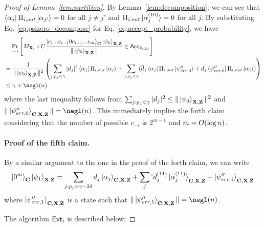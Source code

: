 \begin{proof}[Proof of Lemma~\ref{lem:partition}]
By Lemma~\ref{lem:decomposition}, we can see that $\bra{\alpha_j}\Pi_{i,out} \ket{\alpha_{j'}}=0$ for all $j\neq j'$ and $\Pi_{i,out} \ket{\alpha_{j}^{(10)}}=0$ for all $j$.
By substituting Eq. \ref{eq:psizero_decompose} for Eq. \ref{eq:accept_probability}, we have
\begin{align*}
&~~~\Pr_{c_{-i}}\left[M_{\regX_i}\circ U\frac{\ket{c_1...c_{i-1}0c_{i+1}...c_m}_{\regC}\ket{\psi_0}_{\regX,\regZ}}{\|\ket{\psi_0}_{\regX,\regZ}\|}\in \Acc_{k_i,y_i}\right]\\
&=\frac{1}{\|\ket{\psi_0}_{\regX,\regZ}\|^2}\left(\sum_{j:p_j<\gamma} |d_j|^2 \bra{\alpha_j} \Pi_{i,out} \ket{\alpha_j}+ \sum_{j:p_j<\gamma} (\overline{d}_j \bra{\alpha_j}\Pi_{i,out} \ket{\psi''_{err,0}} + d_j \bra{\psi''_{err,0}}\Pi_{i,out} \ket{\alpha_j})\right)\\
&\leq \gamma+\negl(\secpar)
\end{align*}
where the last inequality follows from $\sum_{j:p_j<\gamma}|d_j|^2\leq \|\ket{\psi_0}_{\mathbf{X},\mathbf{Z}}\|^2$ and $\|\ket{\psi''_{err,0}}_{\regC,\regX,\regZ}\|=\negl(\secpar)$. 
This immediately implies the forth claim considering that the number of possible $c_{-i}$ is $2^{m-1}$ and $m=O(\log n)$.
%
\paragraph{Proof of the fifth claim.}
By a similar argument to the one in the proof of the forth claim, we can write  
\begin{align}
\ket{0^m}_{\mathbf{C}}\ket{\psi_1}_{\mathbf{X},\mathbf{Z}}=\sum_{j:p_j>\gamma-2\delta} d_j \ket{\alpha_j}_{\mathbf{C},\mathbf{X},\mathbf{Z}}+\sum_{j} `d_j^{(11)} \ket{\alpha_j^{(11)}}_{\mathbf{C},\mathbf{X},\mathbf{Z}}+\ket{\psi''_{err,1}}_{\mathbf{C},\mathbf{X},\mathbf{Z}}  \label{eq:psione_decompose} 
\end{align}
where $\ket{\psi''_{err,1}}_{\mathbf{C},\mathbf{X},\mathbf{Z}}$ is a state such that $\|\ket{\psi''_{err,1}}_{\regC,\regX,\regZ}\|=\negl(\secpar)$.

The algorithm $\mathsf{Ext}_{i}$ is described below:


\end{proof}
